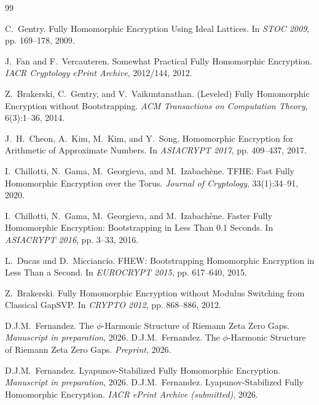 \documentclass[11pt,a4paper]{article}
\theoremstyle{remark}
\begin{document}

\begin{thebibliography}{99}

C.~Gentry.
\newblock Fully Homomorphic Encryption Using Ideal Lattices.
\newblock In \textit{STOC 2009}, pp. 169--178, 2009.

J.~Fan and F.~Vercauteren.
\newblock Somewhat Practical Fully Homomorphic Encryption.
\newblock \textit{IACR Cryptology ePrint Archive}, 2012/144, 2012.

Z.~Brakerski, C.~Gentry, and V.~Vaikuntanathan.
\newblock (Leveled) Fully Homomorphic Encryption without Bootstrapping.
\newblock \textit{ACM Transactions on Computation Theory}, 6(3):1--36, 2014.

J.~H.~Cheon, A.~Kim, M.~Kim, and Y.~Song.
\newblock Homomorphic Encryption for Arithmetic of Approximate Numbers.
\newblock In \textit{ASIACRYPT 2017}, pp. 409--437, 2017.

I.~Chillotti, N.~Gama, M.~Georgieva, and M.~Izabachène.
\newblock TFHE: Fast Fully Homomorphic Encryption over the Torus.
\newblock \textit{Journal of Cryptology}, 33(1):34--91, 2020.

I.~Chillotti, N.~Gama, M.~Georgieva, and M.~Izabachène.
\newblock Faster Fully Homomorphic Encryption: Bootstrapping in Less Than 0.1 Seconds.
\newblock In \textit{ASIACRYPT 2016}, pp. 3--33, 2016.

L.~Ducas and D.~Micciancio.
\newblock FHEW: Bootstrapping Homomorphic Encryption in Less Than a Second.
\newblock In \textit{EUROCRYPT 2015}, pp. 617--640, 2015.

Z.~Brakerski.
\newblock Fully Homomorphic Encryption without Modulus Switching from Classical GapSVP.
\newblock In \textit{CRYPTO 2012}, pp. 868--886, 2012.

D.J.M.~Fernandez.
\newblock The $\phi$-Harmonic Structure of Riemann Zeta Zero Gaps.
\newblock \textit{Manuscript in preparation}, 2026.
D.J.M.~Fernandez.
\newblock The $\phi$-Harmonic Structure of Riemann Zeta Zero Gaps.
\newblock \textit{Preprint}, 2026.

D.J.M.~Fernandez.
\newblock Lyapunov-Stabilized Fully Homomorphic Encryption.
\newblock \textit{Manuscript in preparation}, 2026.
D.J.M.~Fernandez.
\newblock Lyapunov-Stabilized Fully Homomorphic Encryption.
\newblock \textit{IACR ePrint Archive (submitted)}, 2026.


\end{thebibliography}
\end{document}
